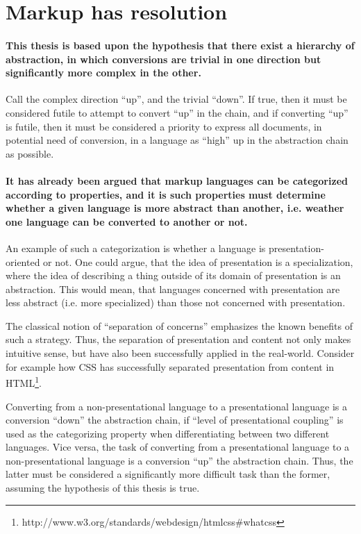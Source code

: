 \documentclass{scrreprt}
\begin{document}
\section{Markup has resolution}

\paragraph{This thesis is based upon the hypothesis that there exist a hierarchy of abstraction, in which conversions are trivial in one direction but significantly more complex in the other.} Call the complex direction ``up'', and the trivial ``down''. If true, then it must be considered futile to attempt to convert ``up'' in the chain, and if converting ``up'' is futile, then it must be considered a priority to express all documents, in potential need of conversion, in a language as ``high'' up in the abstraction chain as possible. 

\paragraph{It has already been argued that markup languages can be categorized according to properties, and it is such properties must determine whether a given language is more abstract than another, i.e. weather one language can be converted to another or not.}
An example of such a categorization is whether a language is presentation-oriented or not. One could argue, that the idea of presentation is a specialization, where the idea of describing a thing outside of its domain of presentation is an abstraction. This would mean, that languages concerned with presentation are less abstract (i.e. more specialized) than those not concerned with presentation.

The classical notion of ``separation of concerns'' emphasizes the known benefits of such a strategy. Thus, the separation of presentation and content not only makes intuitive sense, but have also been successfully applied in the real-world. Consider for example how CSS has successfully separated presentation from content in HTML\footnote{ http://www.w3.org/standards/webdesign/htmlcss\#whatcss}.

Converting from a non-presentational language to a presentational language is a conversion ``down'' the abstraction chain, if ``level of presentational coupling'' is used as the categorizing property when differentiating between two different languages. Vice versa, the task of converting from a presentational language to a non-presentational language is a conversion ``up'' the abstraction chain. Thus, the latter must be considered a significantly more difficult task than the former, assuming the hypothesis of this thesis is true.
\end{document}
